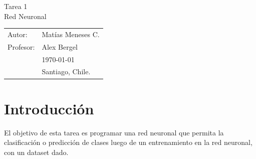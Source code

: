 \documentclass[11pt,letterpaper]{article}
\begin{document}
\newpage
\pagestyle{fancy}
\fancyhf{}
\vspace*{6cm}
\begin{center}
\Huge  {Tarea 1}\\
\vspace{1cm}
\huge {Red Neuronal}\\
\end{center}
\vfill
\begin{flushright}
\begin{tabular}{ll}
Autor: & Matías Meneses C.\\
Profesor: & Alex Bergel\\
& \today\\
& Santiago, Chile.
\end{tabular}
\end{flushright}

\newpage
\pagestyle{fancy}
\fancyhf{}

\fancyhead[R]{\small \rm \textbf{\thepage}} %



\renewcommand{\sectionmark}[1]{\markright{\thesection.\ #1}}
\renewcommand{\headrulewidth}{0.5pt}
\renewcommand{\footrulewidth}{0.5pt}


\tableofcontents

\newpage
\section{Introducción}
El objetivo de esta tarea es programar una red neuronal que permita
la clasificación o predicción de clases luego de un entrenamiento en la red
neuronal, con un dataset dado.\\
\end{document}

